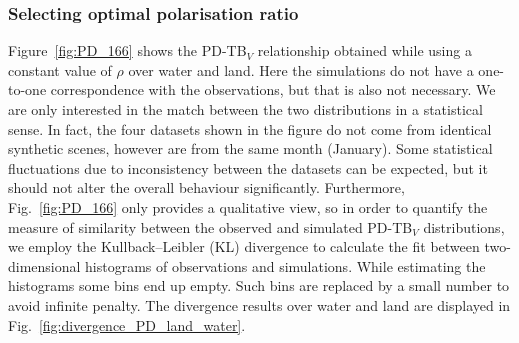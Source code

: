 \documentclass[amt, manuscript]{copernicus}
\begin{document}
\subsubsection{Selecting optimal polarisation ratio}
%
Figure~\ref{fig:PD_166} shows the PD-TB$_V$ relationship obtained while using a constant value of $\rho$ over water and land. Here the simulations do not have a one-to-one correspondence with the observations, but that is also not necessary. We are only interested in the match between the two distributions in a statistical sense. In fact, the four datasets shown in the figure do not come from identical synthetic scenes, however are from the same month (January). Some statistical fluctuations due to inconsistency between the datasets can be expected, but it should not alter the overall behaviour significantly. Furthermore, Fig.~\ref{fig:PD_166} only provides a qualitative view, so in order to quantify the measure of similarity between the observed and simulated PD-TB$_V$ distributions, we employ the Kullback–Leibler (KL) divergence \citep{Joyce:kl:11} to calculate the fit between two-dimensional histograms of observations and simulations. While estimating the histograms some bins end up empty. Such bins are replaced by a small number to avoid infinite penalty. The divergence results over water and land are displayed in Fig.~\ref{fig:divergence_PD_land_water}.
\end{document}
